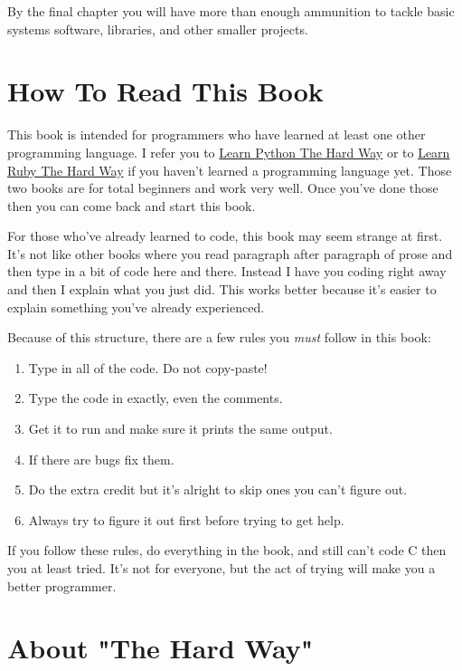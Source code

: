 By the final chapter you will have more than enough ammunition
to tackle basic systems software, libraries, and other smaller
projects.


\section{How To Read This Book}

This book is intended for programmers who have learned at least one other
programming language.  I refer you to
\href{http://learnpythonthehardway.org}{Learn Python The Hard Way} or to
\href{http://ruby.learncodethehardway.org}{Learn Ruby The Hard Way} if you
haven't learned a programming language yet.  Those two books are for total
beginners and work very well.  Once you've done those then you can come back
and start this book.

For those who've already learned to code, this book may seem strange
at first.  It's not like other books where you read paragraph after
paragraph of prose and then type in a bit of code here and there.  Instead
I have you coding right away and then I explain what you just did.
This works better because it's easier to explain something you've 
already experienced.

Because of this structure, there are a few rules you \emph{must} follow
in this book:

\begin{enumerate}
\item Type in all of the code. Do not copy-paste!
\item Type the code in exactly, even the comments.
\item Get it to run and make sure it prints the same output.
\item If there are bugs fix them.
\item Do the extra credit but it's alright to skip ones you can't figure out.
\item Always try to figure it out first before trying to get help.
\end{enumerate}

If you follow these rules, do everything in the book, and still can't
code C then you at least tried.  It's not for everyone, but the act
of trying will make you a better programmer.

\section{About "The Hard Way"}

